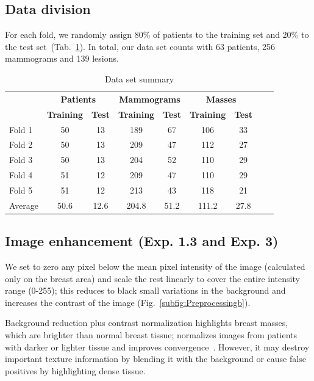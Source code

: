 \subsection{Data division}
For each fold, we randomly assign 80\% of patients to the training set and 20\% to the test set~(Tab.~\ref{tab:DataSetSummary}). In total, our data set counts with 63 patients, 256 mammograms and 139 lesions.

\begin{table}[h]
	\centering
	\begin{tabular}{lcccccccc}
		\hline
		& \multicolumn{2}{c}{\textbf{Patients}} & \multicolumn{2}{c}{\textbf{Mammograms}} &\multicolumn{2}{c}{\textbf{Masses}}\\
		& \textbf{Training} & \textbf{Test} & \textbf{Training} & \textbf{Test} & \textbf{Training} & \textbf{Test} \\
		\hline 
		Fold 1	&50	&13	&189	&67	&106	&33\\
		Fold 2	&50	&13	&209	&47	&112	&27\\
		Fold 3	&50	&13	&204	&52	&110	&29\\
		Fold 4	&51	&12	&209	&47	&110	&29\\
		Fold 5	&51	&12 &213	&43	&118	&21\\
		Average &50.6 &12.6 &204.8 &51.2 &111.2 &27.8\\
		\hline
	\end{tabular}
	\caption[Data set summary]{Data set summary}
	\label{tab:DataSetSummary}
\end{table}

\subsection{Image enhancement (Exp. 1.3 and Exp. 3)}
We set to zero any pixel below the mean pixel intensity of the image (calculated only on the breast area) and scale the rest linearly to cover the entire intensity range (0-255); this reduces to black small variations in the background and increases the contrast of the image (Fig.~\ref{subfig:Preprocessingb}).

Background reduction plus contrast normalization highlights breast masses, which are brighter than normal breast tissue; normalizes images from patients with darker or lighter tissue and improves convergence~\cite{Arevalo2016}. However, it may destroy important texture information by blending it with the background or cause false positives by highlighting dense tissue.

